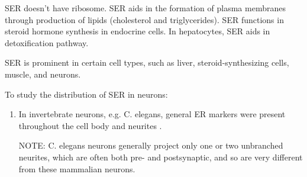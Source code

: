 SER doesn't have ribosome.
SER aids in the formation of plasma membranes through production of lipids
(cholesterol and triglycerides). SER functions in steroid hormone synthesis in
endocrine cells. In hepatocytes, SER aids in detoxification pathway.

SER is prominent in certain cell types, such as liver, steroid-synthesizing
cells, muscle, and neurons.

To study the distribution of SER in neurons:
\begin{enumerate}
  \item In invertebrate neurons, e.g. C. elegans,
  general ER markers were present throughout the cell body
  and neurites \citep{rolls2002}. 
  
NOTE: C. elegans neurons generally project only one or two unbranched neurites,
which are often both pre- and postsynaptic, and so are very different from these
mammalian neurons.

 \citep{ramirez2000}  
\end{enumerate}
